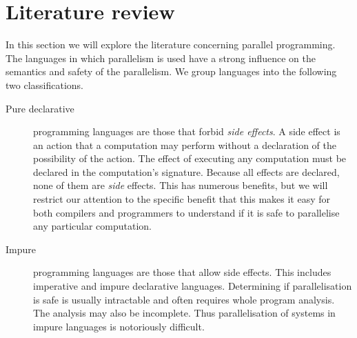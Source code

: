 
%

\section{Literature review}
\label{sec:literature_review}

In this section we will explore the literature concerning parallel
programming.
The languages in which parallelism is used have a strong influence on the
semantics and safety of the parallelism.
We group languages into the following two classifications.

\begin{description}

    \item[Pure declarative] programming languages are those that forbid
    \emph{side effects}.
    A side effect is an action that a computation may perform
    without a declaration of the possibility of the action.
    The effect of executing any computation must be declared in the
    computation's signature.
    Because all effects are declared, none of them are \emph{side} effects.
    This has numerous benefits,
    but we will restrict our attention to the specific benefit
    that this makes it easy for both compilers and programmers to understand
    if it is safe to parallelise any particular computation.

    \item[Impure] programming languages are those that allow side effects.
    This includes imperative and impure declarative languages.
    Determining if parallelisation is safe is usually intractable and often
    requires whole program analysis.
    The analysis may also be incomplete.
    Thus parallelisation of systems in impure languages is notoriously
    difficult.

\end{description}

